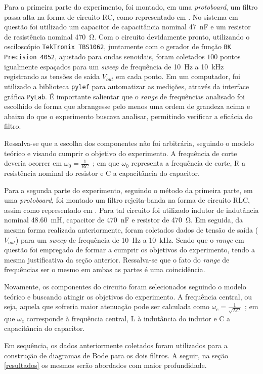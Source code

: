 Para a primeira parte do experimento, foi montado, em uma \textit{protoboard}, um filtro passa-alta na forma de  circuito RC, como representado em . No sistema em questão foi utilizado um capacitor de capacitância nominal \SI{47}{\nano\farad} e um resistor de resistência nominal \SI{470}{\ohm}. Com o circuito devidamente pronto, utilizando o osciloscópio \texttt{TekTronix TBS1062}\cite{ref:osciloscopio}, juntamente com o gerador de função \texttt{BK Precision 4052}\cite{ref:gerador}, ajustado para ondas senoidais, foram coletados $100$ pontos igualmente espaçados para um \textit{sweep} de frequência de \SI{10}{\hertz} a \SI{10}{\kilo\hertz} registrando as tensões de saída $V_{out}$ em cada ponto. Em um computador, foi utilizado a biblioteca \texttt{pylef}\cite{ref:pylef} para automatizar as medições, através da interface gráfica \texttt{PyLab}. É importante salientar que o \textit{range} de frequências analisado foi escolhido de forma que abrangesse pelo menos uma ordem de grandeza acima e abaixo do que o experimento buscava analisar, permitindo verificar a eficácia do filtro.

Ressalva-se que a escolha dos componentes não foi arbitrária, seguindo o modelo teórico e visando cumprir o objetivo do experimento. A frequência de corte deveria ocorrer em $\omega_0=\frac{1}{RC}$~\cite{ref:circuitos}; em que $\omega_0$ representa a frequência de corte, R a resistência nominal do resistor e C a capacitância do capacitor.

Para a segunda parte do experimento, seguindo o método da primeira parte, em uma \textit{protoboard}, foi montado um filtro rejeita-banda na forma de circuito RLC, assim como representado em . Para tal circuito foi utilizado indutor de indutância nominal \SI{48,60}{\milli\henry}, capacitor de \SI{470}{\nano\farad} e resistor de \SI{470}{\ohm}. Em seguida, da mesma forma realizada anteriormente, foram coletados dados de tensão de saída ($V_{out}$) para um \textit{sweep} de frequência de \SI{10}{\hertz} a \SI{10}{\kilo\hertz}. Sendo que o \textit{range} em questão foi empregado de formar a cumprir os objetivos do experimento, tendo a mesma justificativa da seção anterior. Ressalva-se que o fato do \textit{range} de frequências ser o mesmo em ambas as partes é uma coincidência.

Novamente, os componentes do circuito foram selecionados seguindo o modelo teórico e buscando atingir os objetivos do experimento. A frequência central, ou seja, aquela que sofreria maior atenuação pode ser calculada como $\omega_c=\frac{1}{\sqrt{LC}}$~\cite{ref:circuitos}; em que $\omega_c$ corresponde à frequência central, L à indutância do indutor e C a capacitância do capacitor.

Em sequência, os dados anteriormente coletados foram utilizados para a construção de diagramas de Bode para os dois filtros. A seguir, na seção \ref{resultados} os mesmos serão abordados com maior profundidade.

